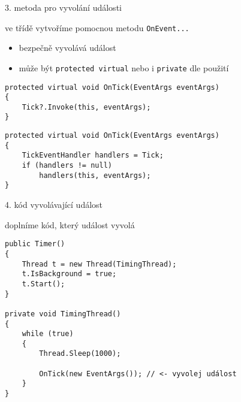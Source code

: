 \begin{frame}[fragile]
\begin{bitemize}{3. metoda pro vyvolání události}
\item ve třídě vytvoříme pomocnou metodu \lstinline|OnEvent...|
\begin{itemize}
\item bezpečně vyvolává událost
\item může být \lstinline|protected virtual| nebo i \lstinline|private| dle použití
\end{itemize}
\end{bitemize}
\vfill
\begin{yesblock}
\begin{lstlisting}
protected virtual void OnTick(EventArgs eventArgs)
{
    Tick?.Invoke(this, eventArgs);
}
\end{lstlisting}
\end{yesblock}
\vfill
\begin{oldblock}
\begin{lstlisting}
protected virtual void OnTick(EventArgs eventArgs)
{
    TickEventHandler handlers = Tick;
    if (handlers != null)
        handlers(this, eventArgs);
}
\end{lstlisting}
\end{oldblock}
\end{frame}







\begin{frame}[fragile]
\vfill
\begin{bitemize}{4. kód vyvolávající událost}
\item doplníme kód, který událost vyvolá
\end{bitemize}
\vfill
\begin{yesblock}
\begin{lstlisting}
public Timer()
{
    Thread t = new Thread(TimingThread);
    t.IsBackground = true;
    t.Start();
}

private void TimingThread()
{
    while (true)
    {
        Thread.Sleep(1000);

        OnTick(new EventArgs()); // <- vyvolej událost
    }
}
\end{lstlisting}
\end{yesblock}
\vfill
\end{frame}




